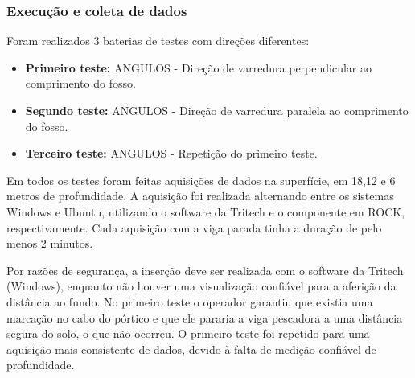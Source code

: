 \subsubsection{Execução e coleta de dados}
Foram realizados 3 baterias de testes com direções diferentes:  

\begin{itemize}
  \item \textbf{Primeiro teste:} ANGULOS - Direção de varredura perpendicular ao
  comprimento do fosso.
  \item \textbf{Segundo teste:} ANGULOS - Direção de varredura paralela ao
  comprimento do fosso.
  \item \textbf{Terceiro teste:} ANGULOS - Repetição do primeiro teste.
\end{itemize}

Em todos os testes foram feitas aquisições de dados na superfície, em 18,12 e 6
metros de profundidade. A aquisição foi realizada alternando entre os sistemas
Windows e Ubuntu, utilizando o software da Tritech e o componente em ROCK,
respectivamente. Cada aquisição com a viga parada tinha a duração de pelo menos
2 minutos.

Por razões de segurança, a inserção deve ser realizada com o
software da Tritech (Windows), enquanto não houver uma visualização confiável para a aferição da distância ao fundo. No primeiro teste o operador garantiu que
existia uma marcação no cabo do pórtico e que ele pararia a viga pescadora a uma
distância segura do solo, o que não ocorreu. O primeiro teste foi repetido para
uma aquisição mais consistente de dados, devido à falta de medição confiável de
profundidade.


 

\label{metodos}


